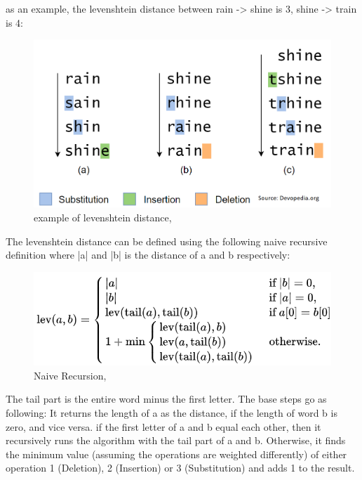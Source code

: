 as an example, the levenshtein distance between rain -> shine is 3, shine -> train is 4:
\begin{figure}[H]
  \centering
  \includegraphics[scale = 0.6]{figures/levenshtein_example.png}
  \caption{example of levenshtein distance, \cite{levenshtein_distance}}
\end{figure}

The levenshtein distance can be defined using the following naive recursive definition where |a| and |b| is the distance of a and b respectively:
\begin{figure}[H]
  \centering
  \includegraphics[scale = 0.7]{figures/levenshtein_recursive.png}
  \caption{Naive Recursion, \cite{levenshtein_recursive_definition}}
\end{figure}
The tail part is the entire word minus the first letter.
The base steps go as following: It returns the length of a as the distance, if the length of word b is zero, and vice versa.
if the first letter of a and b equal each other, then it recursively runs the algorithm with the tail part of a and b.
Otherwise, it finds the minimum value (assuming the operations are weighted differently) of either operation 1 (Deletion), 2 (Insertion) or 3 (Substitution) and adds 1 to the result.
\\

